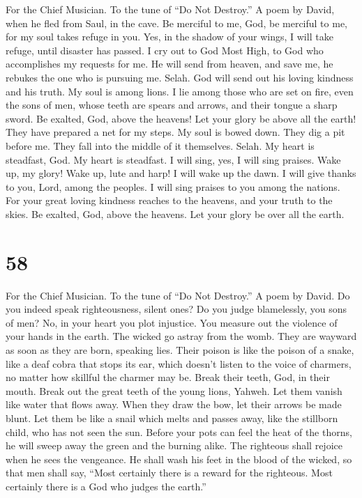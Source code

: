 For the Chief Musician. To the tune of ``Do Not Destroy.'' A poem by
David, when he fled from Saul, in the cave.  Be merciful
to me, God, be merciful to me, for my soul takes refuge in you. Yes, in
the shadow of your wings, I will take refuge, until disaster has passed.
 I cry out to God Most High, to God who accomplishes my
requests for me.  He will send from heaven, and save me,
he rebukes the one who is pursuing me. Selah. God will send out his
loving kindness and his truth.  My soul is among lions. I
lie among those who are set on fire, even the sons of men, whose teeth
are spears and arrows, and their tongue a sharp sword.  Be
exalted, God, above the heavens! Let your glory be above all the earth!
 They have prepared a net for my steps. My soul is bowed
down. They dig a pit before me. They fall into the middle of it
themselves. Selah.  My heart is steadfast, God. My heart
is steadfast. I will sing, yes, I will sing praises.  Wake
up, my glory! Wake up, lute and harp! I will wake up the dawn.
 I will give thanks to you, Lord, among the peoples. I
will sing praises to you among the nations.  For your
great loving kindness reaches to the heavens, and your truth to the
skies.  Be exalted, God, above the heavens. Let your
glory be over all the earth.

\hypertarget{section-57}{%
\section{58}\label{section-57}}

For the Chief Musician. To the tune of ``Do Not Destroy.'' A poem by
David.  Do you indeed speak righteousness, silent ones? Do
you judge blamelessly, you sons of men?  No, in your heart
you plot injustice. You measure out the violence of your hands in the
earth.  The wicked go astray from the womb. They are
wayward as soon as they are born, speaking lies.  Their
poison is like the poison of a snake, like a deaf cobra that stops its
ear,  which doesn't listen to the voice of charmers, no
matter how skillful the charmer may be.  Break their
teeth, God, in their mouth. Break out the great teeth of the young
lions, Yahweh.  Let them vanish like water that flows
away. When they draw the bow, let their arrows be made blunt.
 Let them be like a snail which melts and passes away,
like the stillborn child, who has not seen the sun. 
Before your pots can feel the heat of the thorns, he will sweep away the
green and the burning alike.  The righteous shall rejoice
when he sees the vengeance. He shall wash his feet in the blood of the
wicked,  so that men shall say, ``Most certainly there is
a reward for the righteous. Most certainly there is a God who judges the
earth.''

